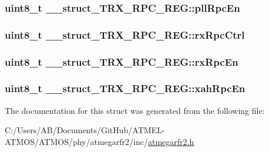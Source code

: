 \hypertarget{struct____struct___t_r_x___r_p_c___r_e_g_ad954d4f82c1d5e5e465ad4286a4e1152}{
\subsubsection[{pll\-Rpc\-En}]{\setlength{\rightskip}{0pt plus 5cm}uint8\-\_\-t \-\_\-\-\_\-struct\-\_\-\-T\-R\-X\-\_\-\-R\-P\-C\-\_\-\-R\-E\-G\-::pll\-Rpc\-En}}\label{struct____struct___t_r_x___r_p_c___r_e_g_ad954d4f82c1d5e5e465ad4286a4e1152}
\hypertarget{struct____struct___t_r_x___r_p_c___r_e_g_a918c87c88d3d35aea73de79b6273f4ff}{
\subsubsection[{rx\-Rpc\-Ctrl}]{\setlength{\rightskip}{0pt plus 5cm}uint8\-\_\-t \-\_\-\-\_\-struct\-\_\-\-T\-R\-X\-\_\-\-R\-P\-C\-\_\-\-R\-E\-G\-::rx\-Rpc\-Ctrl}}\label{struct____struct___t_r_x___r_p_c___r_e_g_a918c87c88d3d35aea73de79b6273f4ff}
\hypertarget{struct____struct___t_r_x___r_p_c___r_e_g_a5c9717d039a5e0c9f5735f5e4a7148ad}{
\subsubsection[{rx\-Rpc\-En}]{\setlength{\rightskip}{0pt plus 5cm}uint8\-\_\-t \-\_\-\-\_\-struct\-\_\-\-T\-R\-X\-\_\-\-R\-P\-C\-\_\-\-R\-E\-G\-::rx\-Rpc\-En}}\label{struct____struct___t_r_x___r_p_c___r_e_g_a5c9717d039a5e0c9f5735f5e4a7148ad}
\hypertarget{struct____struct___t_r_x___r_p_c___r_e_g_a0595720eda3e7f94162270dc7e48be5d}{
\subsubsection[{xah\-Rpc\-En}]{\setlength{\rightskip}{0pt plus 5cm}uint8\-\_\-t \-\_\-\-\_\-struct\-\_\-\-T\-R\-X\-\_\-\-R\-P\-C\-\_\-\-R\-E\-G\-::xah\-Rpc\-En}}\label{struct____struct___t_r_x___r_p_c___r_e_g_a0595720eda3e7f94162270dc7e48be5d}


The documentation for this struct was generated from the following file\-:\begin{DoxyCompactItemize}
\item 
C\-:/\-Users/\-A\-B/\-Documents/\-Git\-Hub/\-A\-T\-M\-E\-L-\/\-A\-T\-M\-O\-S/\-A\-T\-M\-O\-S/phy/atmegarfr2/inc/\hyperlink{atmegarfr2_8h}{atmegarfr2.\-h}\end{DoxyCompactItemize}

